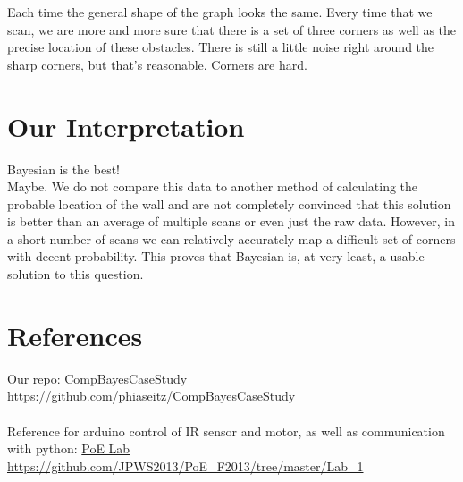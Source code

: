 \documentclass{article}
\begin{document}
Each time the general shape of the graph looks the same. Every time that we scan, we are more and more sure that there is a set of three corners as well as the precise location of these obstacles. There is still a little noise right around the sharp corners, but that's reasonable. Corners are hard.  \\

\section{Our Interpretation}
Bayesian is the best!\\
Maybe. We do not compare this data to another method of calculating the probable location of the wall and are not completely convinced that this solution is better than an average of multiple scans or even just the raw data. However, in a short number of scans we can relatively accurately map a difficult set of corners with decent probability. This proves that Bayesian is, at very least, a usable solution to this question.

\section{References}
Our repo: \href{https://github.com/phiaseitz/CompBayesCaseStudy}{CompBayesCaseStudy}\\
\url{https://github.com/phiaseitz/CompBayesCaseStudy}\\ \\
Reference for arduino control of IR sensor and motor, as well as communication with python: \href{https://github.com/JPWS2013/PoE_F2013/tree/master/Lab_1}{PoE Lab}\\
\url{https://github.com/JPWS2013/PoE_F2013/tree/master/Lab_1}\\
\end{document}
